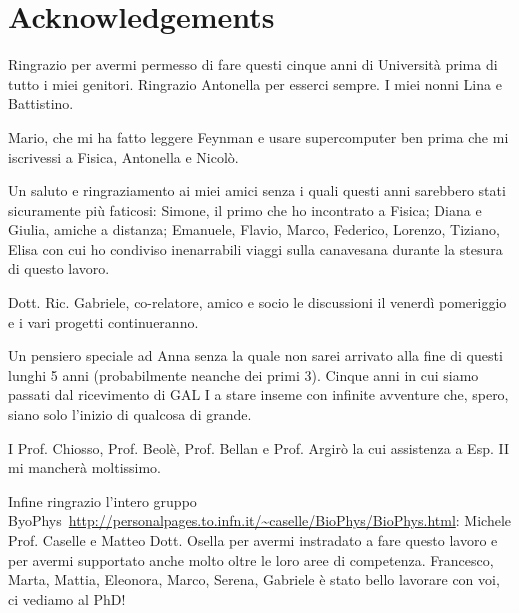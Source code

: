 \chapter*{Acknowledgements}
Ringrazio per avermi permesso di fare questi cinque anni di Università prima di tutto i miei genitori.
Ringrazio Antonella per esserci sempre. I miei nonni Lina e Battistino.

Mario, che mi ha fatto leggere Feynman e usare supercomputer ben prima che mi iscrivessi a Fisica, Antonella e Nicolò.

Un saluto e ringraziamento ai miei amici senza i quali questi anni sarebbero stati sicuramente più faticosi: Simone, il primo che ho incontrato a Fisica; Diana e Giulia, amiche a distanza; Emanuele, Flavio, Marco, Federico, Lorenzo, Tiziano, Elisa con cui ho condiviso inenarrabili viaggi sulla canavesana durante la stesura di questo lavoro.

Dott. Ric. Gabriele, co-relatore, amico e socio le discussioni il venerdì pomeriggio e i vari progetti continueranno.

Un pensiero speciale ad Anna senza la quale non sarei arrivato alla fine di questi lunghi 5 anni (probabilmente neanche dei primi 3). Cinque anni in cui siamo passati dal ricevimento di GAL I a stare inseme con infinite avventure che, spero, siano solo l'inizio di qualcosa di grande.

I Prof. Chiosso, Prof. Beolè, Prof. Bellan e Prof. Argirò la cui assistenza a Esp. II mi mancherà moltissimo.

Infine ringrazio l'intero gruppo ByoPhys~\url{http://personalpages.to.infn.it/~caselle/BioPhys/BioPhys.html}: Michele Prof. Caselle e Matteo Dott. Osella per avermi instradato a fare questo lavoro e per avermi supportato anche molto oltre le loro aree di competenza.
Francesco, Marta, Mattia, Eleonora, Marco, Serena, Gabriele è stato bello lavorare con voi, ci vediamo al PhD!

